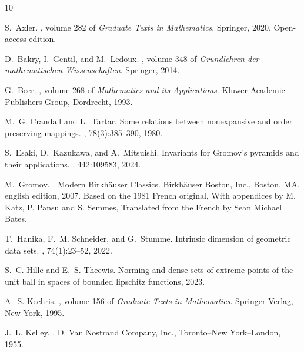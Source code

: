 \documentclass[11pt]{amsart}
\theoremstyle{plain}
\theoremstyle{definition}
\theoremstyle{remark}
\begin{document}
\begin{thebibliography}{10}

S.~Axler.
, volume 282 of {\em
  Graduate Texts in Mathematics}.
\newblock Springer, 2020.
\newblock Open-access edition.

D.~Bakry, I.~Gentil, and M.~Ledoux.
, volume 348
  of {\em Grundlehren der mathematischen Wissenschaften}.
\newblock Springer, 2014.

G.~Beer.
, volume 268 of {\em
  Mathematics and its Applications}.
\newblock Kluwer Academic Publishers Group, Dordrecht, 1993.

M.~G. Crandall and L.~Tartar.
\newblock Some relations between nonexpansive and order preserving mappings.
, 78(3):385--390, 1980.

S.~Esaki, D.~Kazukawa, and A.~Mitsuishi.
\newblock Invariants for {G}romov's pyramids and their applications.
, 442:109583, 2024.

M.~Gromov.
.
\newblock Modern Birkh\"auser Classics. Birkh\"auser Boston, Inc., Boston, MA,
  english edition, 2007.
\newblock Based on the 1981 French original, With appendices by M. Katz, P.
  Pansu and S. Semmes, Translated from the French by Sean Michael Bates.

T.~Hanika, F.~M. Schneider, and G.~Stumme.
\newblock Intrinsic dimension of geometric data sets.
, 74(1):23--52, 2022.

S.~C. Hille and E.~S. Theewis.
\newblock Norming and dense sets of extreme points of the unit ball in spaces
  of bounded lipschitz functions, 2023.

A.~S. Kechris.
, volume 156 of {\em Graduate
  Texts in Mathematics}.
\newblock Springer-Verlag, New York, 1995.

J.~L. Kelley.
.
\newblock D. Van Nostrand Company, Inc., Toronto--New York--London, 1955.


\end{thebibliography}
\end{document}
